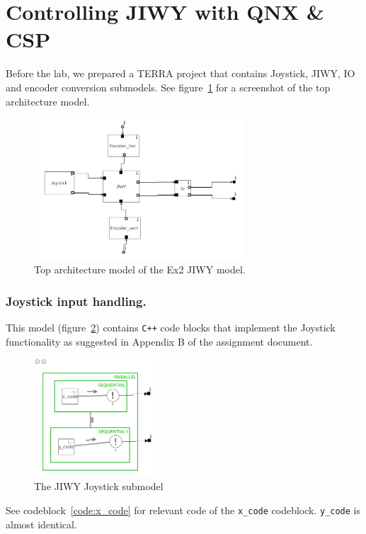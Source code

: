 \documentclass[a4paper,twoside,11pt]{article}
\newcommand{\cpp}{{\tt C++} }
\begin{document}
\section{Controlling JIWY with QNX \& CSP}
Before the lab, we prepared a TERRA project that contains Joystick, JIWY, IO and 
encoder conversion submodels. See figure~\ref{fig:jiwy-overview} for a screenshot of the top architecture model.
\begin{figure}[ht]
	\centering
	\includegraphics[width=0.7\textwidth]{./img/jiwy-overview.png}
	\caption{Top architecture model of the Ex2 JIWY model.}
	\label{fig:jiwy-overview}
\end{figure}
\subsubsection{Joystick input handling.}
This model (figure~\ref{fig:jiwy-joystick}) contains \cpp code blocks that implement the Joystick 
functionality as suggested in Appendix B of the assignment document.

\begin{figure}[ht]
	\centering
	\includegraphics[width=0.4\textwidth]{./img/jiwy-joystick.png}
	\caption{The JIWY Joystick submodel}
	\label{fig:jiwy-joystick}
\end{figure}
See codeblock~\ref{code:x_code} for relevant code of the \texttt{x\_code} codeblock. \texttt{y\_code} is almost identical.
\end{document}
